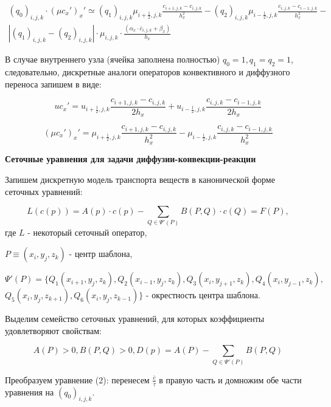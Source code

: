 \documentclass[12pt]{article}
\begin{document}
 \begin{multline*} 
 	(q_0)_{i,j,k}\cdot (\mu c_x')_x'\simeq (q_1)_{i,j,k}\mu _{i+\frac{1}{2},j,k}\frac{c_{i+1,j,k}-c_{i,j,k}}{h_x^2} - (q_2)_{i,j,k}\mu _{i-\frac{1}{2},j,k}\frac{c_{i,j,k}-c_{i-1,j,k}}{h_x^2} - \\
 	|(q_1)_{i,j,k}-(q_2)_{i,j,k}| \cdot \mu_{i,j,k}\cdot \frac{(\alpha_x\cdot\bar{c}_{i,j,k}+\beta_x)}{h_x} 
 \end{multline*} 
 
 В случае внутреннего узла (ячейка заполнена полностью) $q_0=1, q_1=q_2=1$, следовательно, дискретные аналоги  операторов конвективного и диффузного переноса запишем в виде:
 
\begin{equation*}
	uc_x'=u_{i+\frac{1}{2},j,k}\frac{c_{i+1,j,k}-c_{i,j,k}}{2h_x} + u_{i-\frac{1}{2},j,k}\frac{c_{i,j,k}-c_{i-1,j,k}}{2h_x}  
\end{equation*}
 
\begin{equation*}
    (\mu c_x')_x'=\mu_{i+\frac{1}{2},j,k}\frac{c_{i+1,j,k}-c_{i,j,k}}{h_x^2} - \mu_{i-\frac{1}{2},j,k}\frac{c_{i,j,k}-c_{i-1,j,k}}{h_x^2}
\end{equation*}

 \center \textbf  {Сеточные уравнения для задачи диффузии-конвекции-реакции}

Запишем дискретную модель транспорта веществ в канонической форме сеточных уравнений:


\begin{equation}
	L(c(p)) = A(p)\cdot c(p)-\sum_{Q\in \Psi'(P)}B(P,Q)\cdot c(Q) = F(P),
\end{equation}
где $L$ - некоторый сеточный оператор,

$P\equiv(x_i,y_j,z_k)$ - центр шаблона,

$\Psi'(P)=\{Q_1(x_{i+1},y_j,z_k), Q_2(x_{i-1},y_j,z_k), Q_3(x_i,y_{j+1},z_k), Q_4(x_i,y_{j-1},z_k),$ $ Q_5(x_i,y_j,z_{k+1}), Q_6(x_i,y_j,z_{k-1})\} $  - окрестность центра шаблона.

Выделим семейство сеточных уравнений, для которых коэффициенты удовлетворяют свойствам:

\begin{equation}
A(P)>0, B(P,Q)>0, D(p)=A(P) - \sum_{Q\in \Psi'(P)}B(P,Q)   
\end{equation}

\begin{flushleft} Преобразуем уравнение (2):
перенесем $ \frac{\bar{c}}{\tau} $ в правую часть и домножим обе части уравнения на $(q_0)_{i,j,k}$.
\end{flushleft}
\end{document}
